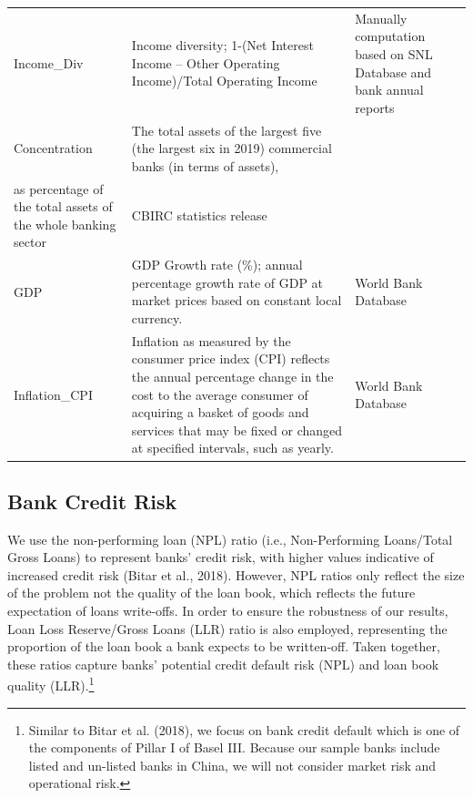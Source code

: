 \documentclass[
  12pt,
  a4paper,
]{scrreprt}
\begin{document}
\begin{table}
{{\begin{tabular}[t]{l>{\raggedright\arraybackslash}p{25em}>{\raggedright\arraybackslash}p{12em}}
\hspace{1em}Income\_Div & Income diversity; 1-(Net Interest Income – Other Operating Income)/Total Operating Income & Manually computation based on SNL Database and bank annual reports\\
Concentration & The total assets of the largest five (the largest six in 2019) commercial banks (in terms of assets), 
\addlinespace[0.3em]
\multicolumn{3}{l}{\textbf{Industry and Macro Variables}}\\
\hspace{1em}                as percentage of the total assets of the whole banking sector & CBIRC statistics release\\
\hspace{1em}GDP & GDP Growth rate (\%); annual percentage growth rate of GDP at market prices based on constant local currency. & World Bank Database\\
Inflation\_CPI & Inflation as measured by the consumer price index (CPI) reflects the annual percentage change 
                in the cost to the average consumer of acquiring a basket of goods and services that may be fixed or changed 
\hspace{1em}                at specified intervals, such as yearly. & World Bank Database\\
\bottomrule
\end{tabular}}

}

\end{table}%

\subsection{Bank Credit Risk}\label{bank-credit-risk}

We use the non-performing loan (NPL) ratio (i.e., Non-Performing
Loans/Total Gross Loans) to represent banks' credit risk, with higher
values indicative of increased credit risk (Bitar et al., 2018).
However, NPL ratios only reflect the size of the problem not the quality
of the loan book, which reflects the future expectation of loans
write-offs. In order to ensure the robustness of our results, Loan Loss
Reserve/Gross Loans (LLR) ratio is also employed, representing the
proportion of the loan book a bank expects to be written-off. Taken
together, these ratios capture banks' potential credit default risk
(NPL) and loan book quality (LLR).\footnote{Similar to Bitar et al.
  (2018), we focus on bank credit default which is one of the components
  of Pillar I of Basel III. Because our sample banks include listed and
  un-listed banks in China, we will not consider market risk and
  operational risk.}
\end{document}

